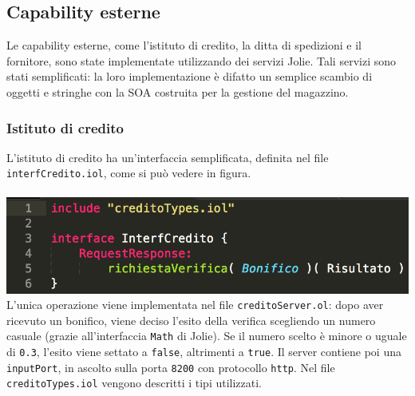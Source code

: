 \subsection{Capability esterne}
Le capability esterne, come l'istituto di credito, la ditta di
spedizioni e il fornitore, sono state implementate utilizzando dei
servizi Jolie. Tali servizi sono stati semplificati: la loro
implementazione \`e difatto un semplice scambio di oggetti e stringhe
con la SOA costruita per la gestione del magazzino.

\subsubsection*{Istituto di credito}
L'istituto di credito ha un'interfaccia semplificata, definita nel file
{\tt interfCredito.iol}, come si pu\`o vedere in figura. \\\\
\includegraphics[scale=0.5]{immagini/interfCredito.png}\\
L'unica operazione viene implementata nel file {\tt creditoServer.ol}:
dopo aver ricevuto un bonifico, viene deciso l'esito della verifica
scegliendo un numero casuale (grazie all'interfaccia {\tt Math} di
Jolie). Se il numero scelto \`e minore o uguale di {\tt 0.3}, l'esito
viene settato a {\tt false}, altrimenti a {\tt true}.
Il server contiene poi una {\tt inputPort}, in ascolto sulla porta
{\tt 8200} con protocollo {\tt http}.
Nel file {\tt creditoTypes.iol} vengono descritti i tipi utilizzati.

